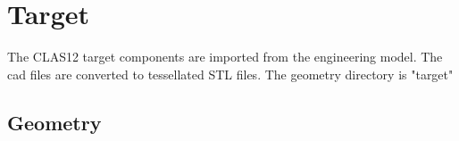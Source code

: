 \section{Target}

The CLAS12 target components are imported from the engineering model. The cad files are converted to tessellated STL files.
The geometry directory is "target"

\subsection{Geometry}





